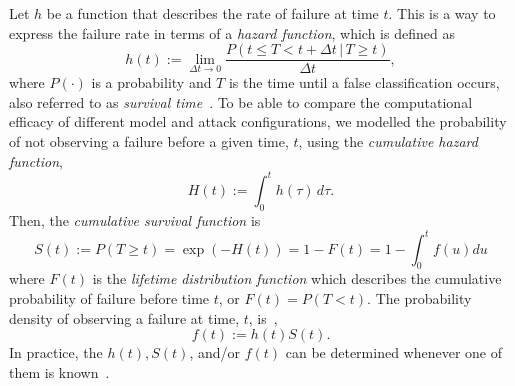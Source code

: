 Let $h$ be a function that describes the rate of failure at time $t$.
This is a way to express the failure rate in terms of a \textit{hazard function}, which is defined as
\begin{equation}
    h(t) := \lim_{ \Delta t \rightarrow 0} \frac{P(t \leq T < t + \Delta t \,|\, T \geq t)}{\Delta t},
    \label{eq:failure_rate_h}
\end{equation}
where  $P(\cdot)$ is a probability and $T$ is the time until a false classification occurs, also referred to as \textit{survival time}~\cite{kleinbaum1996survival}. To be able to compare the computational efficacy of different model and attack configurations, we modelled the probability of not observing a failure before a given time, $t$, using the \textit{cumulative hazard function},
\begin{equation}
     H(t) := \int_0^{t} h(\tau) \,d\tau.
     \label{eq:cdf}
\end{equation}
Then, the \textit{cumulative survival function} is
\begin{equation}
    S(t) := P(T \geq t) = \exp(-H(t)) = 1 - F(t) = 1-   \int_0^t f(u)du
    \label{eq:S(t)}
\end{equation}
where $F(t)$ is the \textit{lifetime distribution function} which describes the cumulative probability of failure before time $t$, or $F(t) = P(T < t)$.
The probability density of observing a failure at time, $t$, is~\cite{kleinbaum1996survival},
\begin{equation*}
    f(t) := h(t)S(t).
    \label{eq:pdf}
\end{equation*}
In practice, the $h(t), S(t)$, and/or $f(t)$ can be determined whenever one of them is known~\cite{kleinbaum1996survival}.







